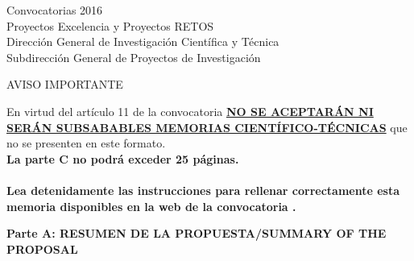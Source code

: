 \documentclass[a4paper,11pt,oneside]{article}
\begin{document}


\begin{tcolorbox}[colback=white,arc=0pt,outer arc=0pt,colframe=black,boxrule=0.6pt]
\begin{center}
Convocatorias 2016\\ 
Proyectos Excelencia y Proyectos RETOS \\ 
Dirección General de Investigación Científica y Técnica \\
Subdirección General de Proyectos de Investigación
\end{center} 
\end{tcolorbox}

\begin{tcolorbox}[colback=yellow,arc=0pt,outer arc=0pt,colframe=black,boxrule=0.6pt,left=0mm,right=0mm]
  \begin{center}
    AVISO IMPORTANTE\\
  \end{center}
    En virtud del art\'iculo 11 de la convocatoria \ul{\textbf{NO SE ACEPTAR\'AN NI SER\'AN SUBSABABLES MEMORIAS CIENT\'IFICO-T\'ECNICAS}} que no se presenten en este formato.
     \\
    \textbf{La parte C no podrá exceder 25 p\'aginas.}
    \\
    \\
    \textbf{Lea detenidamente las instrucciones para rellenar correctamente esta memoria disponibles en la web de la convocatoria .}
    \\
\end{tcolorbox}
\vspace{3pt}
\begin{tcolorbox}[colback=yellow,arc=0pt,outer arc=0pt,colframe=black,boxrule=0.6pt,left=0mm]
  \noindent\textbf{Parte A: RESUMEN DE LA PROPUESTA/SUMMARY OF THE PROPOSAL}
\end{tcolorbox}


\end{document}
